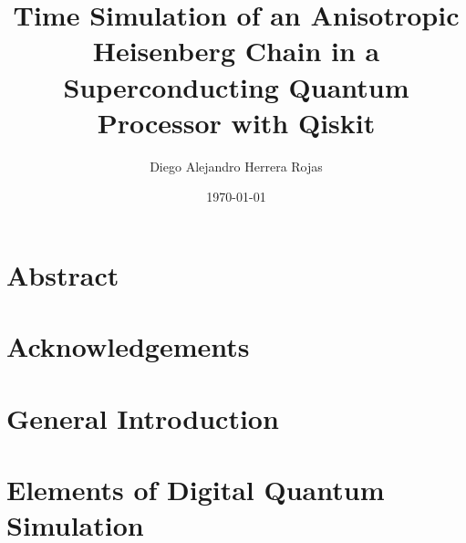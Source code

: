 \documentclass[twoside]{report}
\title{Time Simulation of an Anisotropic Heisenberg Chain in a Superconducting Quantum Processor with Qiskit}
\author{Diego Alejandro Herrera Rojas}
\date{\today}
\begin{document}
  
  \tableofcontents
  \chapter*{Abstract}
  \label{abstract}
  
  \chapter*{Acknowledgements}
  \label{ackn}
  
 \chapter{General Introduction}
 \label{chap:intro}
 
 \chapter{Elements of Digital Quantum Simulation}
 \label{chap:qc}
 
\end{document}
